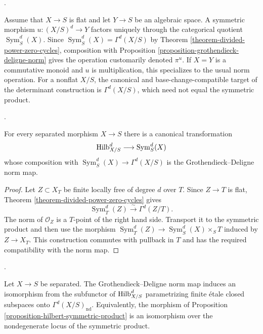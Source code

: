 \begin{remark}
\label{remark-norm-symmetric-morphism}
\begin{reference}
\cite[Expos\'e 221, Section 6]{FGA}.
\end{reference}
Assume that $X \to S$ is flat and let $Y \to S$ be an algebraic space. A
symmetric morphism $u : (X/S)^d \to Y$ factors uniquely through the
categorical quotient $\operatorname{Sym}^d_S(X)$. Since
$\operatorname{Sym}^d_S(X) = \Gamma^d(X/S)$ by Theorem
\ref{theorem-divided-power-zero-cycles}, composition with Proposition
\ref{proposition-grothendieck-deligne-norm} gives the operation customarily
denoted $\pi^u$. If $X = Y$ is a commutative monoid and $u$ is
multiplication, this specializes to the usual norm operation. For a nonflat
$X/S$, the canonical and base-change-compatible target of the determinant
construction is $\Gamma^d(X/S)$, which need not equal the symmetric product.
\end{remark}

\begin{proposition}
\label{proposition-hilbert-symmetric-product}
\begin{reference}
\cite[Definition 4.3.1]{Rydh-hilbert-chow-points}.
\end{reference}
For every separated morphism $X \to S$ there is a canonical transformation
$$
\mathrm{Hilb}^d_{X/S} \longrightarrow \operatorname{Sym}^d_S(X)
$$
whose composition with
$\operatorname{Sym}^d_S(X) \to \Gamma^d(X/S)$ is the
Grothendieck--Deligne norm map.
\end{proposition}

\begin{proof}
Let $Z \subset X_T$ be finite locally free of degree $d$ over $T$. Since
$Z \to T$ is flat, Theorem \ref{theorem-divided-power-zero-cycles} gives
$$
\operatorname{Sym}^d_T(Z) \xrightarrow{\sim} \Gamma^d(Z/T).
$$
The norm of $\mathcal{O}_Z$ is a $T$-point of the right hand side. Transport
it to the symmetric product and then use the morphism
$\operatorname{Sym}^d_T(Z) \to
\operatorname{Sym}^d_S(X) \times_S T$ induced by $Z \to X_T$.
This construction commutes with pullback in $T$ and has the required
compatibility with the norm map.
\end{proof}

\begin{proposition}
\label{proposition-hilbert-chow-nondegenerate}
\begin{reference}
\cite[Section 6]{Rydh-zero-cycles-II}.
\end{reference}
Let $X \to S$ be separated. The Grothendieck--Deligne norm map induces an
isomorphism from the subfunctor of $\mathrm{Hilb}^d_{X/S}$ parametrizing
finite \'etale closed subspaces onto
$\Gamma^d(X/S)_{\mathrm{nd}}$. Equivalently, the morphism of Proposition
\ref{proposition-hilbert-symmetric-product} is an isomorphism over the
nondegenerate locus of the symmetric product.
\end{proposition}


